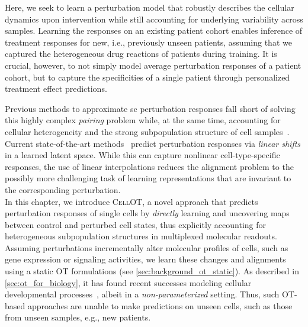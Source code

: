 Here, we seek to learn a perturbation model that robustly describes the cellular dynamics upon intervention while still accounting for underlying variability across samples. Learning the responses on an existing patient cohort enables inference of treatment responses for new, i.e., previously unseen patients, assuming that we captured the heterogeneous drug reactions of patients during training.
It is crucial, however, to not simply model average perturbation responses of a patient cohort, but to capture the specificities of a single patient through personalized treatment effect predictions.

 Previous methods to approximate \acrlong{sc} perturbation responses fall short of solving this highly complex \emph{pairing} problem while, at the same time, accounting for cellular heterogeneity and the strong subpopulation structure of cell samples~\citep{wu2021single,gonzalez2020tumor,li2022single}. 
Current state-of-the-art methods~\citep{lopez2018scvi, lotfollahi2019scgen, yang2020predicting} predict perturbation responses via \emph{linear shifts} in a learned %
latent space.
While this can capture nonlinear cell-type-specific responses, the use of linear interpolations reduces the alignment problem to the possibly more challenging task of learning representations that are invariant to the corresponding perturbation. \\

 In this chapter, we introduce \textsc{CellOT}, a novel approach that predicts perturbation responses of single cells by \emph{directly} learning and uncovering maps between control and perturbed cell states, thus explicitly accounting for heterogeneous subpopulation structures in multiplexed molecular readouts.
Assuming perturbations incrementally alter molecular profiles of cells, such as gene expression or signaling activities, we learn these changes and alignments using a static \acrlong{OT} formulations (see \cref{sec:background_ot_static}). 
As described in \cref{sec:ot_for_biology}, it has found recent successes modeling cellular developmental processes~\citep{lavenant2021towards, schiebinger2019optimal}, albeit in a {\em non-parameterized} setting. Thus, such \acrshort{OT}-based approaches are unable to make predictions on unseen cells, such as those from unseen samples, e.g., new patients. 

